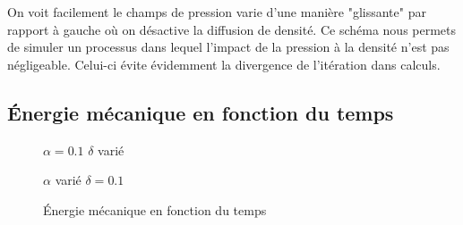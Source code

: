 \documentclass{article}
\begin{document}
On voit facilement le champs de pression varie d'une manière "glissante" par rapport à gauche où on désactive la diffusion de densité. Ce schéma nous permets de simuler un processus dans lequel l'impact de la pression à la densité n'est pas négligeable. Celui-ci évite évidemment la divergence de l'itération dans calculs.
\subsection{Énergie mécanique en fonction du temps}
\begin{figure}[h]
	\begin{minipage}[h]{0.49\linewidth}
		{$\alpha=0.1$ $\delta$ varié}
	\end{minipage}
	\hfill
	\begin{minipage}[h]{0.49\linewidth}
		{$\alpha$ varié $\delta=0.1$}
	\end{minipage}
	\caption{Énergie mécanique en fonction du temps}
\end{figure}
\end{document}
